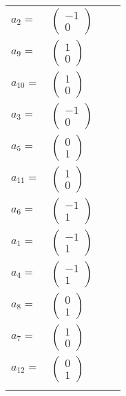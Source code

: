 \documentclass[1p]{elsarticle_modified}
\theoremstyle{definition}
\begin{document}
\begin{tabular}{m{7pt} m{180pt} m{7pt} m{180pt} }
\flushright $a_{2}=$&$\begin{pmatrix}-1\\0\end{pmatrix}$ \\
\flushright $a_{9}=$&$\begin{pmatrix}1\\0\end{pmatrix}$ \\
\flushright $a_{10}=$&$\begin{pmatrix}1\\0\end{pmatrix}$ \\
\flushright $a_{3}=$&$\begin{pmatrix}-1\\0\end{pmatrix}$ \\
\flushright $a_{5}=$&$\begin{pmatrix}0\\1\end{pmatrix}$ \\
\flushright $a_{11}=$&$\begin{pmatrix}1\\0\end{pmatrix}$ \\
\flushright $a_{6}=$&$\begin{pmatrix}-1\\1\end{pmatrix}$ \\
\flushright $a_{1}=$&$\begin{pmatrix}-1\\1\end{pmatrix}$ \\
\flushright $a_{4}=$&$\begin{pmatrix}-1\\1\end{pmatrix}$ \\
\flushright $a_{8}=$&$\begin{pmatrix}0\\1\end{pmatrix}$ \\
\flushright $a_{7}=$&$\begin{pmatrix}1\\0\end{pmatrix}$ \\
\flushright $a_{12}=$&$\begin{pmatrix}0\\1\end{pmatrix}$\\&\end{tabular}
\end{document}
